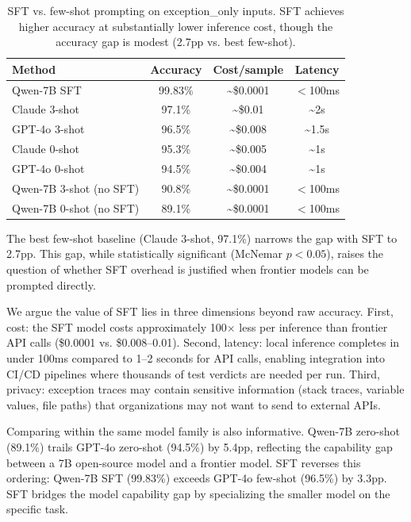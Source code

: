 \documentclass[11pt]{article}
\begin{document}
\begin{table}[t]
\centering
\caption{SFT vs. few-shot prompting on exception\_only inputs. SFT achieves higher accuracy at substantially lower inference cost, though the accuracy gap is modest (2.7pp vs. best few-shot).}
\label{tab:fewshot}
\begin{tabular}{lccc}
\toprule
Method & Accuracy & Cost/sample & Latency \\
\midrule
Qwen-7B SFT & 99.83\% & \textasciitilde\$0.0001 & $<$100ms \\
Claude 3-shot & 97.1\% & \textasciitilde\$0.01 & \textasciitilde2s \\
GPT-4o 3-shot & 96.5\% & \textasciitilde\$0.008 & \textasciitilde1.5s \\
Claude 0-shot & 95.3\% & \textasciitilde\$0.005 & \textasciitilde1s \\
GPT-4o 0-shot & 94.5\% & \textasciitilde\$0.004 & \textasciitilde1s \\
Qwen-7B 3-shot (no SFT) & 90.8\% & \textasciitilde\$0.0001 & $<$100ms \\
Qwen-7B 0-shot (no SFT) & 89.1\% & \textasciitilde\$0.0001 & $<$100ms \\
\bottomrule
\end{tabular}
\end{table}

The best few-shot baseline (Claude 3-shot, 97.1\%) narrows the gap with SFT to 2.7pp. This gap, while statistically significant (McNemar $p < 0.05$), raises the question of whether SFT overhead is justified when frontier models can be prompted directly.

We argue the value of SFT lies in three dimensions beyond raw accuracy. First, cost: the SFT model costs approximately 100$\times$ less per inference than frontier API calls (\$0.0001 vs. \$0.008--0.01). Second, latency: local inference completes in under 100ms compared to 1--2 seconds for API calls, enabling integration into CI/CD pipelines where thousands of test verdicts are needed per run. Third, privacy: exception traces may contain sensitive information (stack traces, variable values, file paths) that organizations may not want to send to external APIs.

Comparing within the same model family is also informative. Qwen-7B zero-shot (89.1\%) trails GPT-4o zero-shot (94.5\%) by 5.4pp, reflecting the capability gap between a 7B open-source model and a frontier model. SFT reverses this ordering: Qwen-7B SFT (99.83\%) exceeds GPT-4o few-shot (96.5\%) by 3.3pp. SFT bridges the model capability gap by specializing the smaller model on the specific task.
\end{document}
